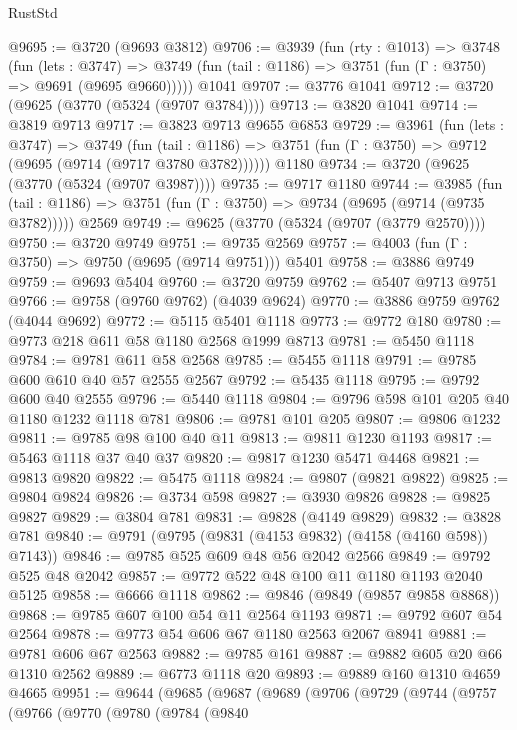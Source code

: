 \begin{lexlean}{RustStd}
\begin{coremodule}
@9695 := @3720 (@9693 @3812)
@9706 := @3939
    (fun (rty : @1013) =>
    @3748
      (fun (lets : @3747) =>
      @3749 (fun (tail : @1186) => @3751 (fun (Γ : @3750) => @9691 (@9695 @9660)))))
    @1041
@9707 := @3776 @1041
@9712 := @3720 (@9625 (@3770 (@5324 (@9707 @3784))))
@9713 := @3820 @1041
@9714 := @3819 @9713
@9717 := @3823 @9713 @9655 @6853
@9729 := @3961
    (fun (lets : @3747) =>
    @3749
      (fun (tail : @1186) => @3751 (fun (Γ : @3750) => @9712 (@9695 (@9714 (@9717 @3780 @3782))))))
    @1180
@9734 := @3720 (@9625 (@3770 (@5324 (@9707 @3987))))
@9735 := @9717 @1180
@9744 := @3985
    (fun (tail : @1186) => @3751 (fun (Γ : @3750) => @9734 (@9695 (@9714 (@9735 @3782)))))
    @2569
@9749 := @9625 (@3770 (@5324 (@9707 (@3779 @2570))))
@9750 := @3720 @9749
@9751 := @9735 @2569
@9757 := @4003 (fun (Γ : @3750) => @9750 (@9695 (@9714 @9751))) @5401
@9758 := @3886 @9749
@9759 := @9693 @5404
@9760 := @3720 @9759
@9762 := @5407 @9713 @9751
@9766 := @9758 (@9760 @9762) (@4039 @9624)
@9770 := @3886 @9759 @9762 (@4044 @9692)
@9772 := @5115 @5401 @1118
@9773 := @9772 @180
@9780 := @9773 @218 @611 @58 @1180 @2568 @1999 @8713
@9781 := @5450 @1118
@9784 := @9781 @611 @58 @2568
@9785 := @5455 @1118
@9791 := @9785 @600 @610 @40 @57 @2555 @2567
@9792 := @5435 @1118
@9795 := @9792 @600 @40 @2555
@9796 := @5440 @1118
@9804 := @9796 @598 @101 @205 @40 @1180 @1232 @1118 @781
@9806 := @9781 @101 @205
@9807 := @9806 @1232
@9811 := @9785 @98 @100 @40 @11
@9813 := @9811 @1230 @1193
@9817 := @5463 @1118 @37 @40 @37
@9820 := @9817 @1230 @5471 @4468
@9821 := @9813 @9820
@9822 := @5475 @1118
@9824 := @9807 (@9821 @9822)
@9825 := @9804 @9824
@9826 := @3734 @598
@9827 := @3930 @9826
@9828 := @9825 @9827
@9829 := @3804 @781
@9831 := @9828 (@4149 @9829)
@9832 := @3828 @781
@9840 := @9791 (@9795 (@9831 (@4153 @9832) (@4158 (@4160 @598)) @7143))
@9846 := @9785 @525 @609 @48 @56 @2042 @2566
@9849 := @9792 @525 @48 @2042
@9857 := @9772 @522 @48 @100 @11 @1180 @1193 @2040 @5125
@9858 := @6666 @1118
@9862 := @9846 (@9849 (@9857 @9858 @8868))
@9868 := @9785 @607 @100 @54 @11 @2564 @1193
@9871 := @9792 @607 @54 @2564
@9878 := @9773 @54 @606 @67 @1180 @2563 @2067 @8941
@9881 := @9781 @606 @67 @2563
@9882 := @9785 @161
@9887 := @9882 @605 @20 @66 @1310 @2562
@9889 := @6773 @1118 @20
@9893 := @9889 @160 @1310 @4659 @4665
@9951 := @9644
    (@9685
      (@9687
        (@9689
          (@9706
            (@9729
              (@9744
                (@9757
                  (@9766
                    (@9770
                      (@9780
                        (@9784
                          (@9840

\end{coremodule}
\end{lexlean}
